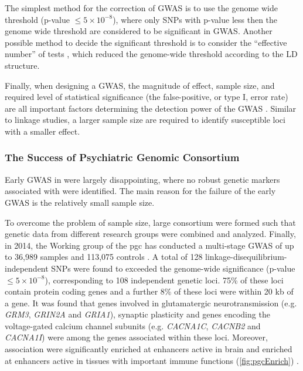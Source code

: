	The simplest method for the correction of \gls{GWAS} is to use the genome wide threshold (p-value $\le5\times10^{-8}$), where only \glspl{SNP} with p-value less then the genome wide threshold are considered to be significant in \gls{GWAS}.
	Another possible method to decide the significant threshold is to consider the ``effective number'' of tests \citep{Li2011}, which reduced the genome-wide threshold according to the \gls{LD} structure.
	
	Finally, when designing a \gls{GWAS}, the magnitude of effect, sample size, and required level of statistical significance (the false-positive, or type I, error rate) are all important factors determining the detection power of the \gls{GWAS} \citep{Purcell2003}.
	Similar to linkage studies, a larger sample size are required to identify susceptible loci with a smaller effect. 
	
	\subsubsection{The Success of Psychiatric Genomic Consortium} 
	Early \gls{GWAS} in  were largely disappointing, where no robust genetic markers associated with  were identified. 
	The main reason for the failure of the early \gls{GWAS} is the relatively small sample size.
	
	To overcome the problem of sample size, large consortium were formed such that genetic data from different research groups were combined and analyzed.
	Finally, in 2014, the  Working group of the \gls{pgc} has conducted a multi-stage  \gls{GWAS} of up to 36,989  samples and 113,075 controls \citep{Ripke2014}.
	A total of 128 linkage-disequilibrium-independent \glspl{SNP} were found to exceeded the genome-wide significance (p-value $\le 5\times10^{-8}$), corresponding to 108 independent genetic loci.
	75\% of these loci contain protein coding genes and a further 8\% of these loci were within 20 \gls{kb} of a gene. 
	It was found that genes involved in glutamatergic neurotransmission (e.g. \textit{GRM3}, \textit{GRIN2A} and \textit{GRIA1}), synaptic plasticity and genes encoding the voltage-gated calcium channel subunits (e.g. \textit{CACNA1C}, \textit{CACNB2} and \textit{CACNA1I}) were among the genes associated within these loci.
	Moreover,  association were significantly enriched at enhancers active in brain and enriched at enhancers active in tissues with important immune functions (\cref{fig:pgcEnrich}) \citep{Ripke2014}.
	
